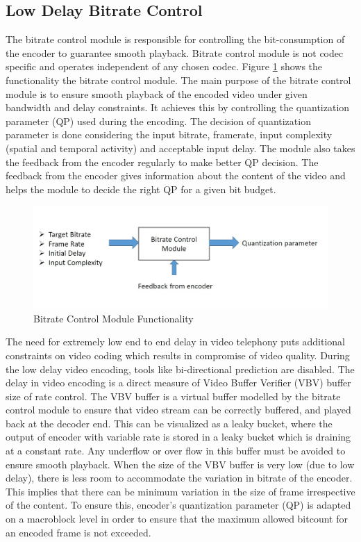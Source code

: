 \documentclass[11pt]{article} %
\begin{document}
  \subsection{Low Delay Bitrate Control}
	The bitrate control module is responsible for controlling the bit-consumption of the encoder to guarantee smooth playback. Bitrate control module is not codec specific and operates independent of any chosen codec. Figure \ref{fig:Bitrate Control Module Functionality} shows the functionality the bitrate control module. The main purpose of the bitrate control module is to ensure smooth playback of the encoded video under given bandwidth and delay constraints.  It achieves this by controlling the quantization parameter (QP) used during the encoding. The decision of quantization parameter is done considering the input bitrate, framerate, input complexity (spatial and temporal activity) and acceptable input delay. The module also takes the feedback from the encoder regularly to make better QP decision.  The feedback from the encoder gives information about the content of the video and helps the module to decide the right QP for a given bit budget.
\begin{figure}[h]
    \centering
    \includegraphics[scale=0.5]{RC_block}
    \caption{Bitrate Control Module Functionality}
    \label{fig:Bitrate Control Module Functionality}
\end{figure} 

The need for extremely low end to end delay in video telephony puts additional constraints on video coding which results in compromise of video quality. During the low delay video encoding, tools like bi-directional prediction are disabled. The delay in video encoding is a direct measure of Video Buffer Verifier (VBV) buffer size of rate control. The VBV buffer is a virtual buffer modelled by the bitrate control module to ensure that video stream can be correctly buffered, and played back at the decoder end. This can be visualized as a leaky bucket, where the output of encoder with variable rate is stored in a leaky bucket which is draining at a constant rate. Any underflow or over flow in this buffer must be avoided to ensure smooth playback. When the size of the VBV buffer is very low (due to low delay), there is less room to accommodate the variation in bitrate of the encoder. This implies that there can be minimum variation in the size of frame irrespective of the content. To ensure this, encoder's quantization parameter (QP) is adapted on a macroblock level in order to ensure that the maximum allowed bitcount for an encoded frame is not exceeded.
\end{document}
